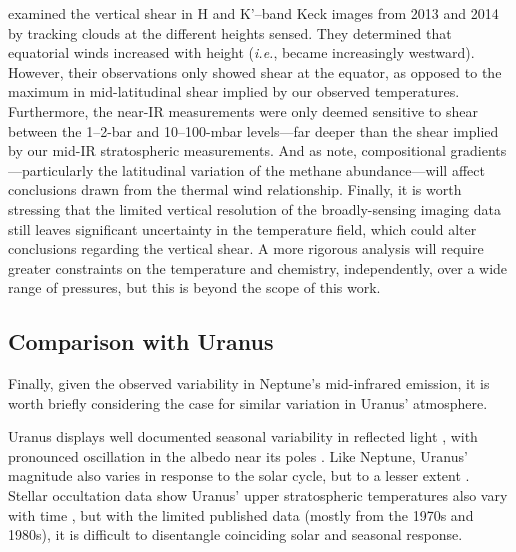 \documentclass[twocolumn,10pt]{aastex631}
\begin{document}

\citet{tollefson2018thermalwind} examined the vertical shear in H and K'--band Keck images from 2013 and 2014 by tracking clouds at the different heights sensed. They determined that equatorial winds increased with height (\textit{i.e.}, became increasingly westward).  However, their observations only showed shear at the equator, as opposed to the maximum in mid-latitudinal shear implied by our observed temperatures.  Furthermore, the near-IR measurements were only deemed sensitive to shear between the 1--2-bar and 10--100-mbar levels---far deeper than the shear implied by our mid-IR stratospheric measurements.  And as \citet{tollefson2018thermalwind} note, compositional gradients---particularly the latitudinal variation of the methane abundance---will affect conclusions drawn from the thermal wind relationship. Finally, it is worth stressing that the limited vertical resolution of the broadly-sensing imaging data still leaves significant uncertainty in the temperature field, which could alter conclusions regarding the vertical shear.  A more rigorous analysis will require greater constraints on the temperature and chemistry, independently, over a wide range of pressures, but this is beyond the scope of this work.  %



\subsection{Comparison with Uranus}
Finally, given the observed variability in Neptune's mid-infrared emission, it is worth briefly considering the case for similar variation in Uranus' atmosphere. 

Uranus displays well documented seasonal variability in reflected light \citep{lockwood2019final}, with pronounced oscillation in the albedo near its poles \citep{rages2004evidence,hammel2007long,irwin2012uranus_seasons,roman2018aerosols,toledo2018uranus}. Like Neptune, Uranus' magnitude also varies in response to the solar cycle, but to a lesser extent \citep{aplin2017solar}. Stellar occultation data show Uranus' upper stratospheric temperatures also vary with time \citep{sicardy1985_uranus_variations,baron1989oblateness,roques1994neptune,young2001uranus}, but with the limited published data (mostly from the 1970s and 1980s), it is difficult to disentangle coinciding solar and seasonal response. 
\end{document}
